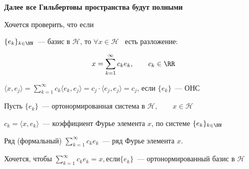 \textbf{Далее все Гильбертовы пространства будут полными}

Хочется проверить, что если

$\{ e_k \}_{k \in \NN}$~--- базис в $\mathcal{H}$, то $ \forall x \in \mathcal{H}$~ есть разложение:

\[ x = \sum_{k=1}^\infty c_k e_k, \qquad c_k \in \RR \]

$ \langle x, e_j \rangle  = \sum_{k=1}^\infty c_k  \langle e_k, e_j \rangle  = c_j \cdot \langle e_j, e_j \rangle = c_j$, если $\{ e_k \}$~--- ОНС

\begin{Definition}{}{}
	Пусть $\{ e_k\}$~--- ортонормированная система в $ \mathcal{H}, \qquad x \in \mathcal{H}$
	
	$c_k =  \langle x, e_k \rangle $~--- коэффициент Фурье элемента $x$, по системе $\{ e_k\}_{k \in \NN}$
	
	Ряд (формальный) $\sum_{k=1}^{\infty} c_k e_k$~--- ряд Фурье элемента $x$.
	
	
\end{Definition}

Хочется, чтобы $\sum_{k=1}^\infty c_k e_k = x, \text{если}  \{ e_k \}$~--- ортонормированный базис в $\mathcal{H}$


